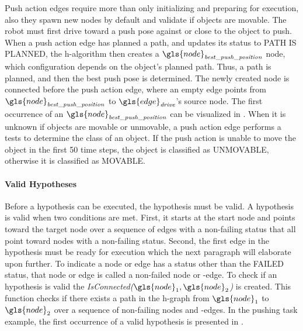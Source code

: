 Push action edges require more than only initializing and preparing for execution, also they spawn new nodes by default and validate if objects are movable. The robot must first drive toward a push pose against or close to the object to push. When a push action edge has planned a path, and updates its status to PATH IS PLANNED, the \ac{h-algorithm} then creates a $\gls{node}_\mathit{best\_push\_position}$ node, which configuration depends on the object's planned path. Thus, a path is planned, and then the best push pose is determined. The newly created node is connected before the push action edge, where an empty edge points from $\gls{node}_\mathit{best\_push\_position}$ to $\gls{edge}_\mathit{drive}$'s source node. The first occurrence of an $\gls{node}_\mathit{best\_push\_position}$ can be visualized in . When it is unknown if objects are movable or unmovable, a push action edge performs a tests to determine the class of an object. If the push action is unable to move the object in the first 50 time steps, the object is classified as UNMOVABLE, otherwise it is classified as MOVABLE.\bs

\paragraph{Valid Hypotheses}
Before a hypothesis can be executed, the hypothesis must be valid. A hypothesis is valid when two conditions are met. First, it starts at the start node and points toward the target node over a sequence of edges with a non-failing status that all point toward nodes with a non-failing status. Second, the first edge in the hypothesis must be ready for execution which the next paragraph will elaborate upon further. To indicate a node or edge has a status other than the FAILED status, that node or edge is called a non-failed node or -edge. To check if an hypothesis is valid the \textit{IsConnected($\gls{node}_1, \gls{node}_2$)} is created. This function checks if there exists a path in the \ac{h-graph} from $\gls{node}_1$ to $\gls{node}_2$ over a sequence of non-failing nodes and -edges. In the pushing task example, the first occurrence of a valid hypothesis is presented in .\bs

